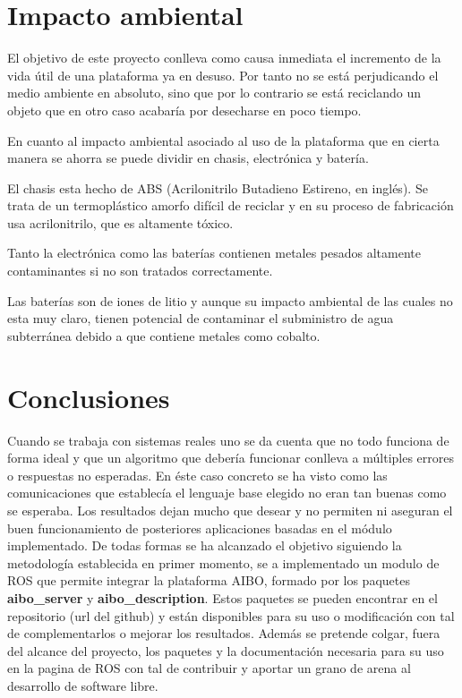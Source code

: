 \documentclass[12pt,a4paper,final,twoside]{book}
\begin{document}
\newpage

\section{Impacto ambiental}
El objetivo de este proyecto conlleva como causa inmediata el incremento de la vida útil de una plataforma ya en desuso. Por tanto no se está perjudicando el medio ambiente en absoluto, sino que por lo contrario se está reciclando un objeto que en otro caso acabaría por desecharse en poco tiempo.

En cuanto al impacto ambiental asociado al uso de la plataforma que en cierta manera se ahorra se puede dividir en chasis, electrónica y batería.

El chasis esta hecho de ABS (Acrilonitrilo Butadieno Estireno, en inglés). Se trata de un termoplástico amorfo difícil de reciclar y en su proceso de fabricación usa acrilonitrilo, que es altamente tóxico.

Tanto la electrónica como las baterías contienen metales pesados altamente contaminantes si no son tratados correctamente.

Las baterías son de iones de litio y aunque su impacto ambiental de las cuales no esta muy claro, tienen potencial de contaminar el subministro de agua subterránea debido a que contiene metales como cobalto.


\newpage
\section*{Conclusiones}


Cuando se trabaja con sistemas reales uno se da cuenta que no todo funciona de forma ideal y que un algoritmo que debería funcionar conlleva a múltiples errores o respuestas no esperadas. En éste caso concreto se ha visto como las comunicaciones que establecía el lenguaje base elegido no eran tan buenas como se esperaba. Los resultados dejan mucho que desear y no permiten ni aseguran el buen funcionamiento de posteriores aplicaciones basadas en el módulo implementado. De todas formas se ha alcanzado el objetivo siguiendo la metodología establecida en primer momento, se a implementado un modulo de ROS que permite integrar la plataforma AIBO, formado por los paquetes \textbf{aibo{\_}server} y \textbf{aibo{\_}description}. Estos paquetes se pueden encontrar en el repositorio (url del github) y están disponibles para su uso o modificación con tal de complementarlos o mejorar los resultados. Además se pretende colgar, fuera del alcance del proyecto, los paquetes y la documentación necesaria para su uso en la pagina de ROS con tal de contribuir y aportar un grano de arena al desarrollo de software libre.
\end{document}
